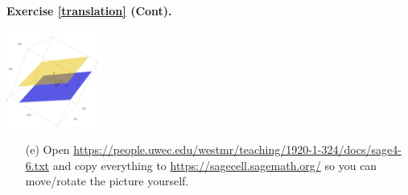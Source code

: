 \documentclass{beamer}
\newcommand{\fn}{\insertframenumber}
\theoremstyle{definition}
\newtheorem{exercise}{Exercise}
\begin{document}
\begin{frame}{\fn}
\begin{block}{\textbf{Exercise \ref{translation} (Cont).}}
	\begin{center}
		\includegraphics[width=1.25in]{images/solution_set}
	\end{center}
	\begin{enumerate}[label=(\alph*)]
		\item[(e)] Open
		{ \tiny\url{https://people.uwec.edu/westmr/teaching/1920-1-324/docs/sage4-6.txt}}
		and copy everything to \url{https://sagecell.sagemath.org/} so you can move/rotate the picture yourself.
	\end{enumerate}
\end{block}
\end{frame}
\end{document}
